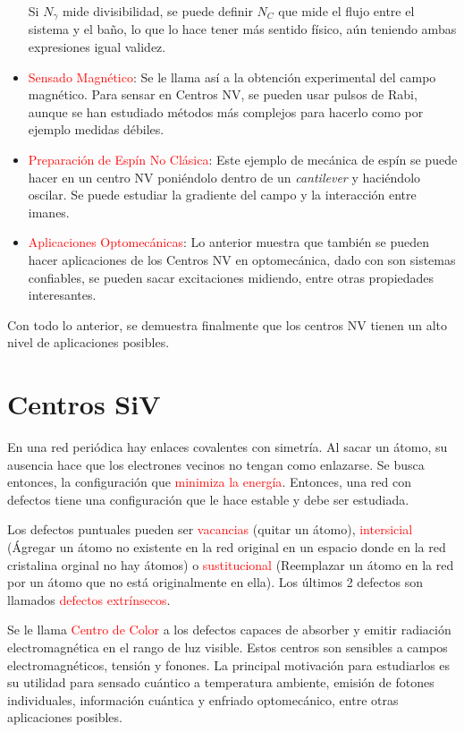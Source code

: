 \documentclass{book}
\begin{document}
\begin{itemize}
    Si $N_\gamma$ mide divisibilidad, se puede definir $N_C$ que mide el flujo entre el sistema y el baño, lo que lo hace tener más sentido físico, aún teniendo ambas expresiones igual validez.
    \item \textcolor{red}{Sensado Magnético}: Se le llama así a la obtención experimental del campo magnético. Para sensar en Centros NV, se pueden usar pulsos de Rabi, aunque se han estudiado métodos más complejos para hacerlo como por ejemplo medidas débiles.
    \item\textcolor{red}{Preparación de Espín No Clásica}: Este ejemplo de mecánica de espín se puede hacer en un centro NV poniéndolo dentro de un \textit{cantilever} y haciéndolo oscilar. Se puede estudiar la gradiente del campo y la interacción entre imanes. 
    \item\textcolor{red}{Aplicaciones Optomecánicas}: Lo anterior muestra que también se pueden hacer aplicaciones de los Centros NV en optomecánica, dado con son sistemas confiables, se pueden sacar excitaciones midiendo, entre otras propiedades interesantes. 
\end{itemize}

Con todo lo anterior, se demuestra finalmente que los centros NV tienen un alto nivel de aplicaciones posibles.


\section{Centros SiV}

En una red periódica hay enlaces covalentes con simetría. Al sacar un átomo, su ausencia hace que los electrones vecinos no tengan como enlazarse. Se busca entonces, la configuración que \textcolor{red}{minimiza la energía}. Entonces, una red con defectos tiene una configuración que le hace estable y debe ser estudiada.

Los defectos puntuales pueden ser \textcolor{red}{vacancias} (quitar un átomo), \textcolor{red}{intersicial} (Ágregar un átomo no existente en la red original en un espacio donde en la red cristalina orginal no hay átomos) o \textcolor{red}{sustitucional} (Reemplazar un átomo en la red por un átomo que no está originalmente en ella). Los últimos 2 defectos son llamados \textcolor{red}{defectos extrínsecos}. 

Se le llama \textcolor{red}{Centro de Color} a los defectos capaces de absorber y emitir radiación electromagnética en el rango de luz visible. Estos centros son sensibles a campos electromagnéticos, tensión y fonones. La principal motivación para estudiarlos es su utilidad para sensado cuántico a temperatura ambiente, emisión de fotones individuales, información cuántica y enfriado optomecánico, entre otras aplicaciones posibles.
\end{document}
